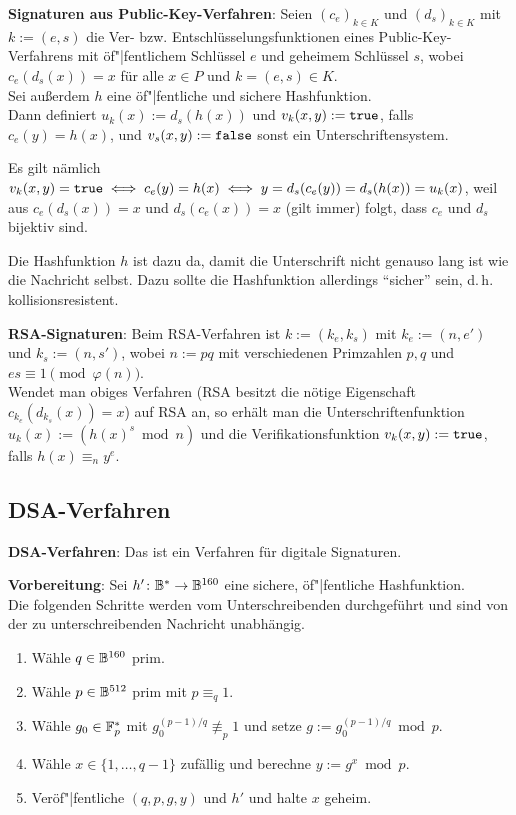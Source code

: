 \textbf{Signaturen aus Public-Key-Verfahren}:
Seien $(c_e)_{k \in K}$ und $(d_s)_{k \in K}$ mit $k := (e, s)$
die Ver- bzw. Entschlüsselungsfunktionen eines Public-Key-Verfahrens mit öf"|fentlichem Schlüssel $e$
und geheimem Schlüssel $s$, wobei $c_e(d_s(x)) = x$ für alle $x \in P$ und $k = (e, s) \in K$.\\
Sei außerdem $h$ eine öf"|fentliche und sichere Hashfunktion.\\
Dann definiert $u_k(x) := d_s(h(x))$ und $v_k(x, y) := \texttt{true}$, falls $c_e(y) = h(x)$,
und $v_s(x, y) := \texttt{false}$ sonst ein Unterschriftensystem.

Es gilt nämlich $v_k(x, y) = \texttt{true} \iff c_e(y) = h(x) \iff y = d_s(c_e(y)) = d_s(h(x)) = u_k(x)$,
weil aus $c_e(d_s(x)) = x$ und $d_s(c_e(x)) = x$ (gilt immer) folgt, dass $c_e$ und $d_s$ bijektiv
sind.

Die Hashfunktion $h$ ist dazu da, damit die Unterschrift nicht genauso lang ist wie die Nachricht
selbst.
Dazu sollte die Hashfunktion allerdings "`sicher"' sein, d.\,h. kollisionsresistent.

\linie

\textbf{RSA-Signaturen}:
Beim RSA-Verfahren ist $k := (k_e, k_s)$ mit $k_e := (n, e')$ und $k_s := (n, s')$,
wobei $n := pq$ mit verschiedenen Primzahlen $p, q$ und $es \equiv 1 \pmod{\varphi(n)}$.\\
Wendet man obiges Verfahren
(RSA besitzt die nötige Eigenschaft $c_{k_e}(d_{k_s}(x)) = x$) auf RSA an,
so erhält man die Unterschriftenfunktion $u_k(x) := (h(x)^s \bmod n)$ und
die Verifikationsfunktion $v_k(x, y) := \texttt{true}$, falls $h(x) \equiv_n y^e$.

\pagebreak

\subsection{%
    DSA-Verfahren%
}

\textbf{DSA-Verfahren}:
Das  ist ein Verfahren für
digitale Signaturen.

\textbf{Vorbereitung}:
Sei $h'\colon \mathbb{B}^\ast \to \mathbb{B}^{160}$ eine sichere, öf"|fentliche Hashfunktion.\\
Die folgenden Schritte werden vom Unterschreibenden durchgeführt und sind von der zu
unterschreibenden Nachricht unabhängig.
\begin{enumerate}
    \item
    Wähle $q \in \mathbb{B}^{160}$ prim.

    \item
    Wähle $p \in \mathbb{B}^{512}$ prim mit $p \equiv_q 1$.

    \item
    Wähle $g_0 \in \mathbb{F}_p^\ast$ mit $g_0^{(p-1)/q} \not\equiv_p 1$ und setze
    $g := g_0^{(p-1)/q} \bmod p$.

    \item
    Wähle $x \in \{1, \dotsc, q - 1\}$ zufällig und berechne $y := g^x \bmod p$.

    \item
    Veröf"|fentliche $(q, p, g, y)$ und $h'$ und halte $x$ geheim.
\end{enumerate}

